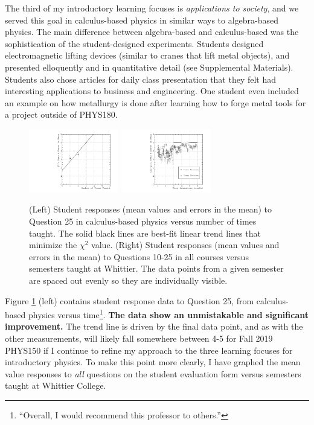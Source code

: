 \documentclass[../../main.tex]{subfiles}
\begin{document}
The third of my introductory learning focuses is \textit{applications to society}, and we served this goal in calculus-based physics in similar ways to algebra-based physics.  The main difference between algebra-based and calculus-based was the sophistication of the student-designed experiments.  Students designed electromagnetic lifting devices (similar to cranes that lift metal objects), and presented elloquently and in quantitative detail (see Supplemental Materials).  Students also chose articles for daily class presentation that they felt had interesting applications to business and engineering.  One student even included an example on how metallurgy is done after learning how to forge metal tools for a project outside of PHYS180. \\ \hspace{0.1cm}

\begin{figure}
\centering
\includegraphics[width=0.35\textwidth]{Q25_calculus_based.pdf}
\includegraphics[width=0.35\textwidth]{Q10_Q25_all_courses_vs_time.pdf}
\caption{\label{fig:courses:intro_q25_2}  (Left) Student responses (mean values and errors in the mean) to Question 25 in calculus-based physics versus number of times taught.  The solid black lines are best-fit linear trend lines that minimize the $\chi^2$ value. (Right) Student responses (mean values and errors in the mean) to Questions 10-25 in all courses versus semesters taught at Whittier.  The data points from a given semester are spaced out evenly so they are individually visible.}
\end{figure}

Figure \ref{fig:courses:intro_q25_2} (left) contains student response data to Question 25, from calculus-based physics versus time\footnote{``Overall, I would recommend this professor to others.''}.  \textbf{The data show an unmistakable and significant improvement.}  The trend line is driven by the final data point, and as with the other measurements, will likely fall somewhere between 4-5 for Fall 2019 PHYS150 if I continue to refine my approach to the three learning focuses for introductory physics.  To make this point more clearly, I have graphed the mean value responses to \textit{all} questions on the student evaluation form versus semesters taught at Whittier College.  \\ \hspace{0.1cm}
\end{document}
